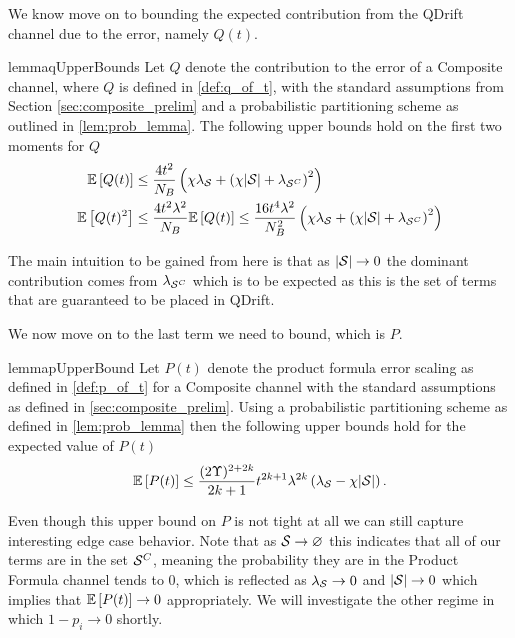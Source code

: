 We know move on to bounding the expected contribution from the QDrift channel due to the error, namely $Q(t)$. 
\begin{restatable}{lemma}{qUpperBounds} \label{lem:expect_q_upper_bounds}
Let $Q$ denote the contribution to the error of a Composite channel, where $Q$ is defined in \ref{def:q_of_t}, with the standard assumptions from Section \ref{sec:composite_prelim} and a probabilistic partitioning scheme as outlined in \ref{lem:prob_lemma}. The following upper bounds hold on the first two moments for $Q$
\begin{align}
    \mathbb{E}\left[ Q(t) \right] &\leq \frac{4 t^2}{N_B} \left( \chi \lambda_{\mathcal{S}} + \left( \chi |\mathcal{S}| + \lambda_{\mathcal{S}^C} \right)^2 \right) \label{eq:expect_q_upper_bound} \\
    \mathbb{E}\left[ Q(t)^2 \right] &\leq \frac{4 t^2 \lambda^2}{N_B} \mathbb{E}\left[ Q(t) \right] \leq \frac{16 t^4 \lambda^2}{N_B^2} \left( \chi \lambda_{\mathcal{S}} + \left( \chi |\mathcal{S}| + \lambda_{\mathcal{S}^C} \right)^2 \right) \label{eq:expect_q_squared_upper_bound}
\end{align}
\end{restatable}

The main intuition to be gained from here is that as $|\mathcal{S}| \to 0$ the dominant contribution comes from $\lambda_{\mathcal{S}^C}$ which is to be expected as this is the set of terms that are guaranteed to be placed in QDrift.

We now move on to the last term we need to bound, which is $P$. 
\begin{restatable}{lemma}{pUpperBound} \label{lem:p_upper_bound}
Let $P(t)$ denote the product formula error scaling as defined in \ref{def:p_of_t} for a Composite channel with the standard assumptions as defined in \ref{sec:composite_prelim}. Using a probabilistic partitioning scheme as defined in \ref{lem:prob_lemma} then the following upper bounds hold for the expected value of $P(t)$
\begin{equation}
    \mathbb{E}\left[ P(t) \right] \leq \frac{(2 \Upsilon)^{2 + 2k}}{2k+1} t^{2k+1} \lambda^{2k} \left( \lambda_{\mathcal{S}} - \chi |\mathcal{S}| \right) .\label{eq:p_upper_bound}
\end{equation}
\end{restatable}
Even though this upper bound on $P$ is not tight at all we can still capture interesting edge case behavior. Note that as $\mathcal{S} \to \varnothing$ this indicates that all of our terms are in the set $\mathcal{S}^C$, meaning the probability they are in the Product Formula channel tends to 0, which is reflected as $\lambda_{\mathcal{S}} \to 0$ and $|\mathcal{S}| \to 0$ which implies that $\mathbb{E}\left[ P(t) \right] \to 0$ appropriately. We will investigate the other 
regime in which $1 - p_i \to 0$ shortly. 

